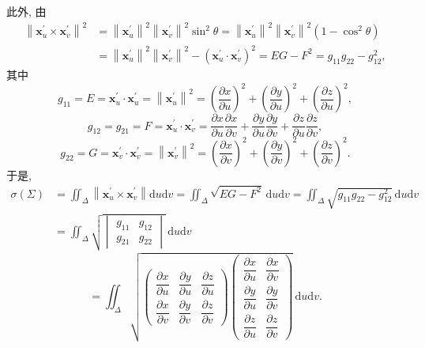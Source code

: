 此外, 由
\begin{align*}
  \left\|\boldsymbol{x}_{u}^{\prime} \times \boldsymbol{x}_{v}^{\prime}\right\|^{2}
  &=\left\|\boldsymbol{x}_{u}^{\prime}\right\|^{2}\left\|\boldsymbol{x}_{v}^{\prime}\right\|^{2} \sin ^{2} \theta=\left\|\boldsymbol{x}_{u}^{\prime}\right\|^{2}\left\|\boldsymbol{x}_{v}^{\prime}\right\|^{2}\left(1-\cos ^{2} \theta\right) \\
  &=\left\|\boldsymbol{x}_{u}^{\prime}\right\|^{2}\left\|\boldsymbol{x}_{v}^{\prime}\right\|^{2}-\left(\boldsymbol{x}_{u}^{\prime} \cdot \boldsymbol{x}_{v}^{\prime}\right)^{2}=E G-F^{2}=g_{11} g_{22}-g_{12}^{2},
\end{align*}
其中
\[
  g_{11}=E=\boldsymbol{x}_{u}^{\prime} \cdot \boldsymbol{x}_{u}^{\prime}=\left\|\boldsymbol{x}_{u}^{\prime}\right\|^{2}=\left(\frac{\partial x}{\partial u}\right)^{2}+\left(\frac{\partial y}{\partial u}\right)^{2}+\left(\frac{\partial z}{\partial u}\right)^{2},
\]
\[
  g_{12}=g_{21}=F=\boldsymbol{x}_{u}^{\prime} \cdot \boldsymbol{x}_{v}^{\prime}=\frac{\partial x}{\partial u} \frac{\partial x}{\partial v}+\frac{\partial y}{\partial u} \frac{\partial y}{\partial v}+\frac{\partial z}{\partial u} \frac{\partial z}{\partial v},
\]
\[
  g_{22}=G=\boldsymbol{x}_{v}^{\prime} \cdot \boldsymbol{x}_{v}^{\prime}=\left\|\boldsymbol{x}_{v}^{\prime}\right\|^{2}=\left(\frac{\partial x}{\partial v}\right)^{2}+\left(\frac{\partial y}{\partial v}\right)^{2}+\left(\frac{\partial z}{\partial v}\right)^{2}.
\]
于是,
\begin{align*}
  \sigma(\Sigma) &=\iint_{\Delta}\left\|\boldsymbol{x}_{u}^{\prime} \times \boldsymbol{x}_{v}^{\prime}\right\| \mathrm{d} u \mathrm{d} v=\iint_{\Delta} \sqrt{E G-F^{2}}\,\mathrm{d} u \mathrm{d} v=\iint_{\Delta} \sqrt{g_{11} g_{22}-g_{12}^{2}}\,\mathrm{d} u \mathrm{d} v \\
  &=\iint_{\Delta} \sqrt{\begin{vmatrix} g_{11} & g_{12} \\ g_{21} & g_{22} \end{vmatrix}}\,\mathrm{d} u \mathrm{d} v
\end{align*}
\[
  =\iint_{\Delta} \sqrt{\begin{pmatrix}
    \dfrac{\partial x}{\partial u} & \dfrac{\partial y}{\partial u} & \dfrac{\partial z}{\partial u} \\[8pt]
    \dfrac{\partial x}{\partial v} & \dfrac{\partial y}{\partial v} & \dfrac{\partial z}{\partial v}
  \end{pmatrix}
  \begin{pmatrix}
    \dfrac{\partial x}{\partial u} & \dfrac{\partial x}{\partial v} \\[8pt]
    \dfrac{\partial y}{\partial u} & \dfrac{\partial y}{\partial v} \\[8pt]
    \dfrac{\partial z}{\partial u} & \dfrac{\partial z}{\partial v}
  \end{pmatrix}}\,\mathrm{d} u \mathrm{d} v.
\]

